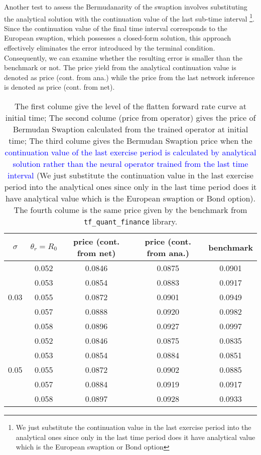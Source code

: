\documentclass[11pt,a4paper]{article}
\theoremstyle{remark}
\begin{document}
 Another test to assess the Bermudanarity of the swaption involves substituting the analytical solution with the continuation value of the last sub-time interval \footnote{We just substitute the continuation value in the last exercise period into the analytical ones since only in the last time period does it have analytical value which is the European swaption or Bond option}. Since the continuation value of the final time interval corresponds to the European swaption, which possesses a closed-form solution, this approach effectively eliminates the error introduced by the terminal condition. Consequently, we can examine whether the resulting error is smaller than the benchmark or not. The price yield from the analytical continuation value is denoted as price (cont. from ana.) while the price from the last network inference is denoted as  price (cont. from net).
	\begin{table}[htbp]
		\centering
		\begin{tabular}{ccccc}
			\hline
			$\sigma$&$\theta_r = R_0$  & price (cont. from net) & price (cont. from ana.) &benchmark \\
			\hline
			\multirow{5}{*}{0.03} &0.052 & 0.0846 & 0.0875 & 0.0901 \\
			&0.053 & 0.0854 & 0.0883  & 0.0917 \\
			&0.055 & 0.0872  & 0.0901 & 0.0949 \\
			&0.057 & 0.0888  & 0.0920 & 0.0982 \\
			&0.058 & 0.0896  & 0.0927 & 0.0997 \\
			\hline  
			\multirow{5}{*}{0.05} & 0.052 & 0.0846 & 0.0875  & 0.0835 \\
			&0.053 & 0.0854 & 0.0884 & 0.0851 \\
			&0.055 & 0.0872  & 0.0902& 0.0885 \\
			&0.057 & 0.0884  & 0.0919& 0.0917 \\
			&0.058 & 0.0897  & 0.0928& 0.0933 \\
			\hline
			
		\end{tabular}
		\caption{The first colume give the level of the flatten forward rate curve at initial time; The second colume (price from operator) gives the price of  Bermudan Swaption calculated from the trained operator at initial time; The third colume gives the  Bermudan Swaption price when the \textcolor{blue}{continuation value of the last exercise period is calculated by analytical solution rather than the neural operator trained from the last time interval} (We just substitute the continuation value in the last exercise period into the analytical ones since only in the last time period does it have analytical value which is the European swaption or Bond option). The fourth colume is the same price given by the benchmark from \texttt{tf\_quant\_finance} library. }
		\label{tab:BSwaption2}
	\end{table}
\end{document}
